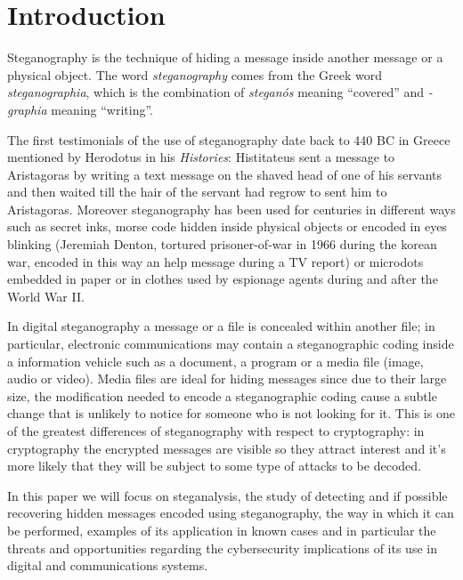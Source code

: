 \documentclass[../../main.tex]{subfiles}
\begin{document}
\section{Introduction}

Steganography is the technique of hiding a message inside another message or a physical object.
The word \textit{steganography} comes from the Greek word \textit{steganographia}, which is the combination of 
\textit{steganós} meaning ``covered'' and \textit{-graphia} meaning ``writing''.

The first testimonials of the use of steganography date back to 440 BC in Greece mentioned by Herodotus in his
\emph{Histories}: Histitateus sent a message to Aristagoras by writing a text message on the shaved head of one of his
servants and then waited till the hair of the servant had regrow to sent him to Aristagoras.
Moreover steganography has been used for centuries in different ways such as secret inks, morse code hidden inside
physical objects or encoded in eyes blinking (Jeremiah Denton, tortured prisoner-of-war in 1966 during the korean
war, encoded in this way an help message during a TV report) or microdots embedded in paper or in clothes used by
espionage agents during and after the World War II.

In digital steganography a message or a file is concealed within another file; in particular, electronic communications
may contain a steganographic coding inside a information vehicle such as a document, a program or a media file (image,
audio or video).
Media files are ideal for hiding messages since due to their large size, the modification needed to encode a
steganographic coding cause a subtle change that is unlikely to notice for someone who is not looking for it.
This is one of the greatest differences of steganography with respect to cryptography: in cryptography the encrypted
messages are visible so they attract interest and it's more likely that they will be subject to some type of attacks to
be decoded.

In this paper we will focus on steganalysis, the study of detecting and if possible recovering hidden messages encoded
using steganography, the way in which it can be performed, examples of its application in known cases and in particular
the threats and opportunities regarding the cybersecurity implications of its use in digital and communications systems.

\pagebreak
\end{document}
